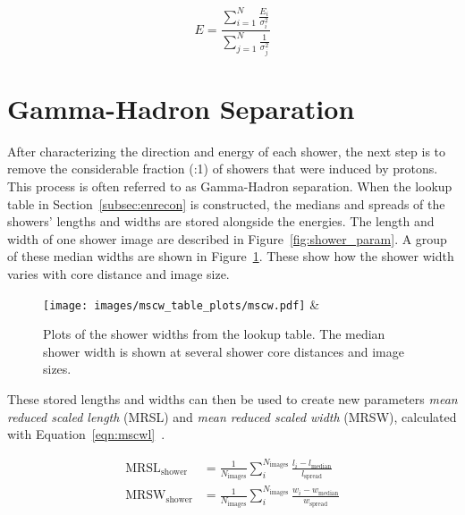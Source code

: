 \begin{equation}\label{eqn:en_avg}
  E = \frac{ \sum_{i=1}^{N} \frac{E_i}{ \sigma_{i}^2} }{ \sum_{j=1}^N \frac{1}{ \sigma_{j}^2 } }
\end{equation}


\section{Gamma-Hadron Separation}

After characterizing the direction and energy of each shower, the next step is to remove the considerable fraction (:1) of showers that were induced by protons.
This process is often referred to as Gamma-Hadron separation.
When the lookup table in Section~\ref{subsec:enrecon} is constructed, the medians and spreads of the showers' lengths and widths are stored alongside the energies.
The length and width of one shower image are described in Figure~\ref{fig:shower_param}.
A group of these median widths are shown in Figure~\ref{fig:mscw_params}.
These show how the shower width varies with core distance and image size.

\begin{figure}[b]
  \centering
  \texttt{[image: images/mscw\_table\_plots/mscw.pdf]} &
  \caption[Shower Median Width]{
    Plots of the shower widths from the lookup table.
    The median shower width is shown at several shower core distances and image sizes.
  }
  \label{fig:mscw_params}
\end{figure}

These stored lengths and widths can then be used to create new parameters \textit{mean reduced scaled length} (MRSL) and \textit{mean reduced scaled width} (MRSW), calculated with Equation~\ref{eqn:mscwl}~\cite{mrswl_technique}.

\begin{equation}\label{eqn:mscwl}
  \begin{split}
    \textrm{MRSL}_{\textrm{shower}} & = \frac{1}{N_{\textrm{images}}} \sum_{i}^{N_{\textrm{images}}} \frac{l_{i}-l_{\textrm{median}}}{l_{\textrm{spread}}} \\
    \textrm{MRSW}_{\textrm{shower}} & = \frac{1}{N_{\textrm{images}}} \sum_{i}^{N_{\textrm{images}}} \frac{w_{i}-w_{\textrm{median}}}{w_{\textrm{spread}}} \\
  \end{split}
\end{equation}

